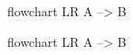 \documentclass{article}
\begin{document}

\begin{mermaid}
flowchart LR
  A --> B
\end{mermaid}


\begin{mermaid}[width=5cm]
flowchart LR
  A --> B
\end{mermaid}
\end{document}
